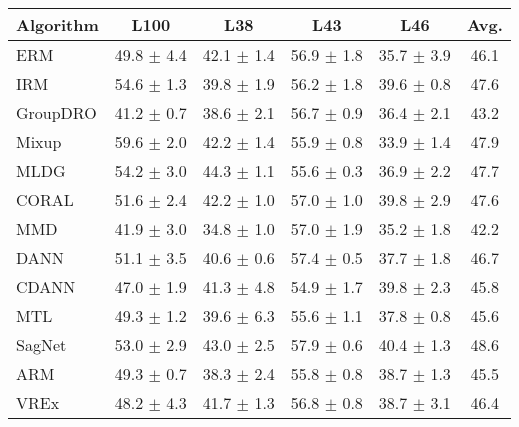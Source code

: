 \begin{table*}
\begin{center}
\begin{tabular}{lccccc}
\toprule
\textbf{Algorithm}   & \textbf{L100}        & \textbf{L38}         & \textbf{L43}         & \textbf{L46}         & \textbf{Avg.}         \\
\midrule
ERM                  & 49.8 $\pm$ 4.4       & 42.1 $\pm$ 1.4       & 56.9 $\pm$ 1.8       & 35.7 $\pm$ 3.9       & 46.1                 \\
IRM                  & 54.6 $\pm$ 1.3       & 39.8 $\pm$ 1.9       & 56.2 $\pm$ 1.8       & 39.6 $\pm$ 0.8       & 47.6                 \\
GroupDRO             & 41.2 $\pm$ 0.7       & 38.6 $\pm$ 2.1       & 56.7 $\pm$ 0.9       & 36.4 $\pm$ 2.1       & 43.2                 \\
Mixup                & 59.6 $\pm$ 2.0       & 42.2 $\pm$ 1.4       & 55.9 $\pm$ 0.8       & 33.9 $\pm$ 1.4       & 47.9                 \\
MLDG                 & 54.2 $\pm$ 3.0       & 44.3 $\pm$ 1.1       & 55.6 $\pm$ 0.3       & 36.9 $\pm$ 2.2       & 47.7                 \\
CORAL                & 51.6 $\pm$ 2.4       & 42.2 $\pm$ 1.0       & 57.0 $\pm$ 1.0       & 39.8 $\pm$ 2.9       & 47.6                 \\
MMD                  & 41.9 $\pm$ 3.0       & 34.8 $\pm$ 1.0       & 57.0 $\pm$ 1.9       & 35.2 $\pm$ 1.8       & 42.2                 \\
DANN                 & 51.1 $\pm$ 3.5       & 40.6 $\pm$ 0.6       & 57.4 $\pm$ 0.5       & 37.7 $\pm$ 1.8       & 46.7                 \\
CDANN                & 47.0 $\pm$ 1.9       & 41.3 $\pm$ 4.8       & 54.9 $\pm$ 1.7       & 39.8 $\pm$ 2.3       & 45.8                 \\
MTL                  & 49.3 $\pm$ 1.2       & 39.6 $\pm$ 6.3       & 55.6 $\pm$ 1.1       & 37.8 $\pm$ 0.8       & 45.6                 \\
SagNet               & 53.0 $\pm$ 2.9       & 43.0 $\pm$ 2.5       & 57.9 $\pm$ 0.6       & 40.4 $\pm$ 1.3       & 48.6                 \\
ARM                  & 49.3 $\pm$ 0.7       & 38.3 $\pm$ 2.4       & 55.8 $\pm$ 0.8       & 38.7 $\pm$ 1.3       & 45.5                 \\
VREx                 & 48.2 $\pm$ 4.3       & 41.7 $\pm$ 1.3       & 56.8 $\pm$ 0.8       & 38.7 $\pm$ 3.1       & 46.4                 \\

\end{tabular}
\end{center}
\end{table*}
